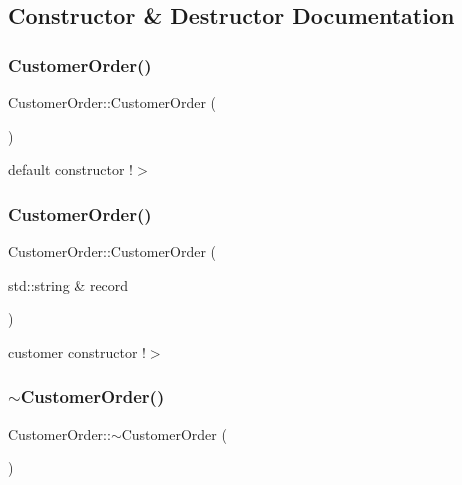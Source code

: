 \subsection{Constructor \& Destructor Documentation}
\mbox{\label{class_customer_order_acbab5cc6c05427a4f4fbba49c3b74f46}} 
\subsubsection{\texorpdfstring{Customer\+Order()}{CustomerOrder()}\hspace{0.1cm}{\footnotesize\ttfamily [1/3]}}
{\footnotesize\ttfamily Customer\+Order\+::\+Customer\+Order (\begin{DoxyParamCaption}{ }\end{DoxyParamCaption})}

default constructor !$>$ \mbox{\label{class_customer_order_a00e1cb818605bcd7457febba4ca9e166}} 
\subsubsection{\texorpdfstring{Customer\+Order()}{CustomerOrder()}\hspace{0.1cm}{\footnotesize\ttfamily [2/3]}}
{\footnotesize\ttfamily Customer\+Order\+::\+Customer\+Order (\begin{DoxyParamCaption}\item[{std\+::string \&}]{record }\end{DoxyParamCaption})}

customer constructor !$>$ \mbox{\label{class_customer_order_ae36af98287386c97b66537ac463b09c6}} 
\subsubsection{\texorpdfstring{$\sim$\+Customer\+Order()}{~CustomerOrder()}}
{\footnotesize\ttfamily Customer\+Order\+::$\sim$\+Customer\+Order (\begin{DoxyParamCaption}{ }\end{DoxyParamCaption})}

